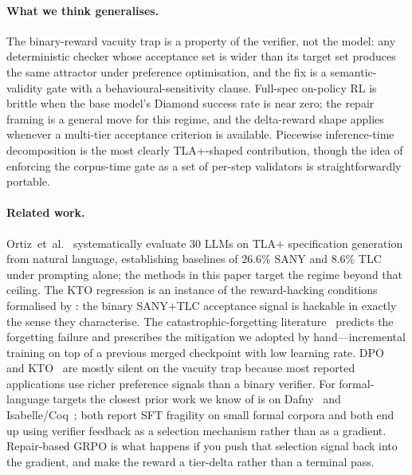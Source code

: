 \documentclass[11pt]{article}
\begin{document}
\paragraph{What we think generalises.} The binary-reward vacuity
trap is a property of the verifier, not the model: any deterministic
checker whose acceptance set is wider than its target set produces
the same attractor under preference optimisation, and the fix is a
semantic-validity gate with a behavioural-sensitivity clause.
Full-spec on-policy RL is brittle when the base model's Diamond
success rate is near zero; the repair framing is a general move for
this regime, and the delta-reward shape applies whenever a
multi-tier acceptance criterion is available. Piecewise
inference-time decomposition is the most clearly TLA+-shaped
contribution, though the idea of enforcing the corpus-time gate as
a set of per-step validators is straightforwardly portable.

\paragraph{Related work.} Ortiz~et~al.~\cite{ortiz2026formallm}
systematically evaluate $30$ LLMs on TLA+ specification generation
from natural language, establishing baselines of $26.6\%$ SANY and
$8.6\%$ TLC under prompting alone; the methods in this paper target
the regime beyond that ceiling.
The KTO regression is an instance of the
reward-hacking conditions formalised by
\cite{skalse2022defining}: the binary SANY$+$TLC acceptance signal
is hackable in exactly the sense they characterise. The
catastrophic-forgetting literature~\cite{kirkpatrick2017ewc,
lopez2017gem} predicts the forgetting failure and prescribes
the mitigation we adopted by
hand---incremental training on top of a previous merged checkpoint
with low learning rate. DPO~\cite{rafailov2023direct} and
KTO~\cite{ethayarajh2024kto} are mostly silent on the vacuity trap
because most reported applications use richer preference signals
than a binary verifier. For formal-language targets the closest
prior work we know of is on Dafny~\cite{misu2024towards} and
Isabelle/Coq~\cite{first2023baldur}; both report SFT fragility on
small formal corpora and both end up using verifier feedback as a
selection mechanism rather than as a gradient. Repair-based GRPO is
what happens if you push that selection signal back into the
gradient, and make the reward a tier-delta rather than a terminal
pass.

\end{document}
